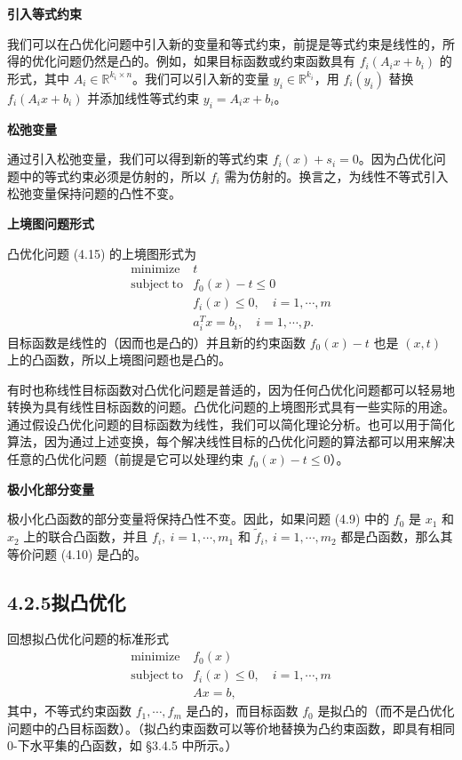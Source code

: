 \documentclass[UTF8,12pt,a4paper,fontset=fandol]{ctexart}
\begin{document}
\noindent\textbf{引入等式约束}

我们可以在凸优化问题中引入新的变量和等式约束，前提是等式约束是线性的，所得的优化问题仍然是凸的。例如，如果目标函数或约束函数具有 $f_i(A_ix+b_i)$ 的形式，其中 $A_i\in\mathbb{R}^{k_i\times n}$。我们可以引入新的变量 $y_i\in\mathbb{R}^{k_i}$，用 $f_i(y_i)$ 替换 $f_i(A_ix+b_i)$ 并添加线性等式约束 $y_i=A_ix+b_i$。

\noindent\textbf{松弛变量}

通过引入松弛变量，我们可以得到新的等式约束 $f_i(x)+s_i=0$。因为凸优化问题中的等式约束必须是仿射的，所以 $f_i$ 需为仿射的。换言之，为线性不等式引入松弛变量保持问题的凸性不变。

\noindent\textbf{上境图问题形式}

凸优化问题 (4.15) 的上境图形式为
\[
\begin{array}{ll}
\mathop{\mathrm{minimize}} & t\\
\mathrm{subject\ to} & f_0(x)-t\leq 0\\
& f_i(x)\leq 0,\quad i=1,\cdots,m\\
& a_i^Tx=b_i,\quad i=1,\cdots,p.
\end{array}
\]
目标函数是线性的（因而也是凸的）并且新的约束函数 $f_0(x)-t$ 也是 $(x,t)$ 上的凸函数，所以上境图问题也是凸的。

有时也称线性目标函数对凸优化问题是普适的，因为任何凸优化问题都可以轻易地转换为具有线性目标函数的问题。凸优化问题的上境图形式具有一些实际的用途。通过假设凸优化问题的目标函数为线性，我们可以简化理论分析。也可以用于简化算法，因为通过上述变换，每个解决线性目标的凸优化问题的算法都可以用来解决任意的凸优化问题（前提是它可以处理约束 $f_0(x)-t\leq 0$）。

\noindent\textbf{极小化部分变量}

极小化凸函数的部分变量将保持凸性不变。因此，如果问题 (4.9) 中的 $f_0$ 是 $x_1$ 和 $x_2$ 上的联合凸函数，并且 $f_i,\ i=1,\cdots,m_1$ 和 $\tilde{f}_i,\ i=1,\cdots,m_2$ 都是凸函数，那么其等价问题 (4.10) 是凸的。

\subsection*{4.2.5\quad 拟凸优化}

回想拟凸优化问题的标准形式
\begin{equation}
\begin{array}{ll}
\mathop{\mathrm{minimize}} & f_0(x)\\
\mathrm{subject\ to} & f_i(x)\leq 0,\quad i=1,\cdots,m\\
& Ax=b,
\end{array}
\tag{4.24}
\end{equation}
其中，不等式约束函数 $f_1,\cdots,f_m$ 是凸的，而目标函数 $f_0$ 是拟凸的（而不是凸优化问题中的凸目标函数）。（拟凸约束函数可以等价地替换为凸约束函数，即具有相同 $0$-下水平集的凸函数，如 §3.4.5 中所示。）
\end{document}
